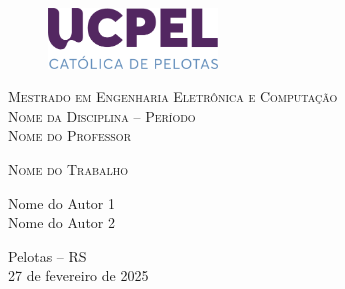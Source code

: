 \thispagestyle{empty}
\begin{titlingpage}

\begin{figure}[!h]
        \centering
	\vspace{-1cm}
	\includegraphics[width=0.4\textwidth]{img/logo_UCPEL_SECUNDARIO.pdf}
	\vspace{-1cm}
\end{figure}

\begin{center}\large
    \textsc{Mestrado em Engenharia Eletrônica e Computação}\\
    \textsc{Nome da Disciplina -- Período}\\
    \textsc{Nome do Professor}
    
    \vspace{4.5cm}
    
    
    \vspace{1cm}
    
    {\Huge \textsc{Nome do Trabalho}}
    
    \vspace{4cm}
    
    Nome do Autor 1 \\
    Nome do Autor 2 
    
    \vfill

    \normalsize{Pelotas -- RS\\27 de fevereiro de 2025}

\end{center}

\end{titlingpage}

